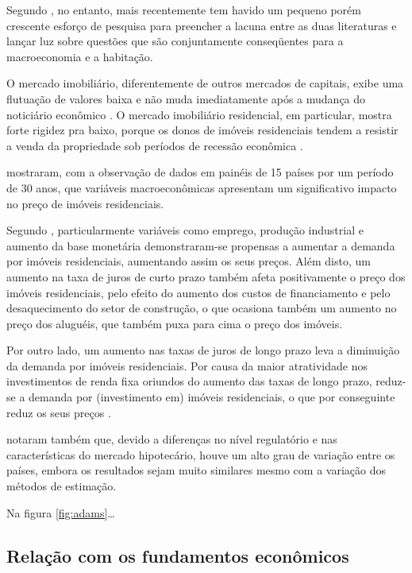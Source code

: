 \documentclass[
	12pt,				%
	oneside,			%
	a4paper,			%
	chapter=TITLE,		%
	section=TITLE,		%
	english,			%
	brazil				%
	]{abntex2}
\begin{document}
Segundo \textcite[p.~4]{LEUNG}, no entanto, mais recentemente tem havido
um pequeno porém crescente esforço de pesquisa para preencher a lacuna
entre as duas literaturas e lançar luz sobre questões que são
conjuntamente conseqüentes para a macroeconomia e a habitação.

O mercado imobiliário, diferentemente de outros mercados de capitais,
exibe uma flutuação de valores baixa e não muda imediatamente após a
mudança do noticiário econômico \autocite[3]{ADAMS201038}. O mercado
imobiliário residencial, em particular, mostra forte rigidez pra baixo,
porque os donos de imóveis residenciais tendem a resistir a venda da
propriedade sob períodos de recessão econômica \autocite[
129]{Case2000}.

\textcite{ADAMS201038} mostraram, com a observação de dados em painéis
de 15 países por um período de 30 anos, que variáveis macroeconômicas
apresentam um significativo impacto no preço de imóveis residenciais.

Segundo \textcite[p.~18]{ADAMS201038}, particularmente variáveis como
emprego, produção industrial e aumento da base monetária demonstraram-se
propensas a aumentar a demanda por imóveis residenciais, aumentando
assim os seus preços. Além disto, um aumento na taxa de juros de curto
prazo também afeta positivamente o preço dos imóveis residenciais, pelo
efeito do aumento dos custos de financiamento e pelo desaquecimento do
setor de construção, o que ocasiona também um aumento no preço dos
aluguéis, que também puxa para cima o preço dos imóveis.

Por outro lado, um aumento nas taxas de juros de longo prazo leva a
diminuição da demanda por imóveis residenciais. Por causa da maior
atratividade nos investimentos de renda fixa oriundos do aumento das
taxas de longo prazo, reduz-se a demanda por (investimento em) imóveis
residenciais, o que por conseguinte reduz os seus preços
\autocite[19]{ADAMS201038}.

\textcite{ADAMS201038} notaram também que, devido a diferenças no nível
regulatório e nas características do mercado hipotecário, houve um alto
grau de variação entre os países, embora os resultados sejam muito
similares mesmo com a variação dos métodos de estimação.

Na figura \ref{fig:adams}\ldots{}

\subsection{Relação com os fundamentos
econômicos}\label{relauxe7uxe3o-com-os-fundamentos-econuxf4micos}
\end{document}
